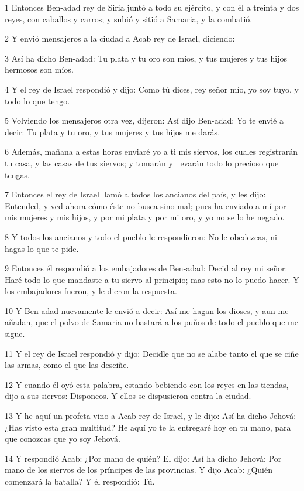 \par 1 Entonces Ben-adad rey de Siria juntó a todo su ejército, y con él a treinta y dos reyes, con caballos y carros; y subió y sitió a Samaria, y la combatió.
\par 2 Y envió mensajeros a la ciudad a Acab rey de Israel, diciendo:
\par 3 Así ha dicho Ben-adad: Tu plata y tu oro son míos, y tus mujeres y tus hijos hermosos son míos.
\par 4 Y el rey de Israel respondió y dijo: Como tú dices, rey señor mío, yo soy tuyo, y todo lo que tengo.
\par 5 Volviendo los mensajeros otra vez, dijeron: Así dijo Ben-adad: Yo te envié a decir: Tu plata y tu oro, y tus mujeres y tus hijos me darás.
\par 6 Además, mañana a estas horas enviaré yo a ti mis siervos, los cuales registrarán tu casa, y las casas de tus siervos; y tomarán y llevarán todo lo precioso que tengas.
\par 7 Entonces el rey de Israel llamó a todos los ancianos del país, y les dijo: Entended, y ved ahora cómo éste no busca sino mal; pues ha enviado a mí por mis mujeres y mis hijos, y por mi plata y por mi oro, y yo no se lo he negado.
\par 8 Y todos los ancianos y todo el pueblo le respondieron: No le obedezcas, ni hagas lo que te pide.
\par 9 Entonces él respondió a los embajadores de Ben-adad: Decid al rey mi señor: Haré todo lo que mandaste a tu siervo al principio; mas esto no lo puedo hacer. Y los embajadores fueron, y le dieron la respuesta.
\par 10 Y Ben-adad nuevamente le envió a decir: Así me hagan los dioses, y aun me añadan, que el polvo de Samaria no bastará a los puños de todo el pueblo que me sigue.
\par 11 Y el rey de Israel respondió y dijo: Decidle que no se alabe tanto el que se ciñe las armas, como el que las desciñe.
\par 12 Y cuando él oyó esta palabra, estando bebiendo con los reyes en las tiendas, dijo a sus siervos: Disponeos. Y ellos se dispusieron contra la ciudad.
\par 13 Y he aquí un profeta vino a Acab rey de Israel, y le dijo: Así ha dicho Jehová: ¿Has visto esta gran multitud? He aquí yo te la entregaré hoy en tu mano, para que conozcas que yo soy Jehová.
\par 14 Y respondió Acab: ¿Por mano de quién? El dijo: Así ha dicho Jehová: Por mano de los siervos de los príncipes de las provincias. Y dijo Acab: ¿Quién comenzará la batalla? Y él respondió: Tú.
